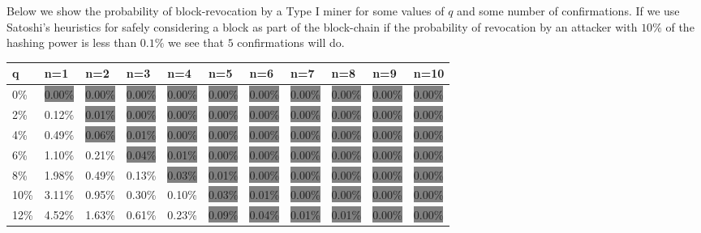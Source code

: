 \documentclass[letterpaper,12pt]{report}
\begin{document}
Below we show the probability of block-revocation by a Type I miner for some values of $q$ and some number of confirmations. If we use Satoshi's heuristics for safely considering a block as part of the block-chain if the probability of revocation by an attacker with $10\%$ of the hashing power is less than $0.1\%$ we see that $5$ confirmations will do. 

\newpage

\begin{table}
\resizebox{18cm}{!} {
    \begin{tabular}{l|llllllllll}
    q  & n=1     & n=2     & n=3     & n=4     & n=5     & n=6     & n=7     & n=8     & n=9     & n=10    \\ \hline
    0\% & \colorbox{gray}{0.00\%}  & \colorbox{gray}{0.00\%}  & \colorbox{gray}{0.00\%}  & \colorbox{gray}{0.00\%}  & \colorbox{gray}{0.00\%}  & \colorbox{gray}{0.00\%}  & \colorbox{gray}{0.00\%}  & \colorbox{gray}{0.00\%}  & \colorbox{gray}{0.00\%}  & \colorbox{gray}{0.00\%}  \\
    2\% & 0.12\%  & \colorbox{gray}{0.01\%}  & \colorbox{gray}{0.00\%}  & \colorbox{gray}{0.00\%}  & \colorbox{gray}{0.00\%}  & \colorbox{gray}{0.00\%}  & \colorbox{gray}{0.00\%}  & \colorbox{gray}{0.00\%}  & \colorbox{gray}{0.00\%}  & \colorbox{gray}{0.00\%}  \\
    4\% & 0.49\%  & \colorbox{gray}{0.06\%}  & \colorbox{gray}{0.01\%}  & \colorbox{gray}{0.00\%}  & \colorbox{gray}{0.00\%}  & \colorbox{gray}{0.00\%}  & \colorbox{gray}{0.00\%}  & \colorbox{gray}{0.00\%}  & \colorbox{gray}{0.00\%}  & \colorbox{gray}{0.00\%}  \\
    6\% & 1.10\%  & 0.21\%  & \colorbox{gray}{0.04\%}  & \colorbox{gray}{0.01\%}  & \colorbox{gray}{0.00\%}  & \colorbox{gray}{0.00\%}  & \colorbox{gray}{0.00\%}  & \colorbox{gray}{0.00\%}  & \colorbox{gray}{0.00\%}  & \colorbox{gray}{0.00\%}  \\
    8\% & 1.98\%  & 0.49\%  & 0.13\%  & \colorbox{gray}{0.03\%}  & \colorbox{gray}{0.01\%}  & \colorbox{gray}{0.00\%}  & \colorbox{gray}{0.00\%}  & \colorbox{gray}{0.00\%}  & \colorbox{gray}{0.00\%}  & \colorbox{gray}{0.00\%}  \\
    10\% & 3.11\%  & 0.95\%  & 0.30\%  & 0.10\%  & \colorbox{gray}{0.03\%}  & \colorbox{gray}{0.01\%}  & \colorbox{gray}{0.00\%}  & \colorbox{gray}{0.00\%}  & \colorbox{gray}{0.00\%}  & \colorbox{gray}{0.00\%}  \\
    12\% & 4.52\%  & 1.63\%  & 0.61\%  & 0.23\%  & \colorbox{gray}{0.09\%}  & \colorbox{gray}{0.04\%}  & \colorbox{gray}{0.01\%}  & \colorbox{gray}{0.01\%}  & \colorbox{gray}{0.00\%}  & \colorbox{gray}{0.00\%}  \\

\end{tabular}}
\end{table}
\end{document}
